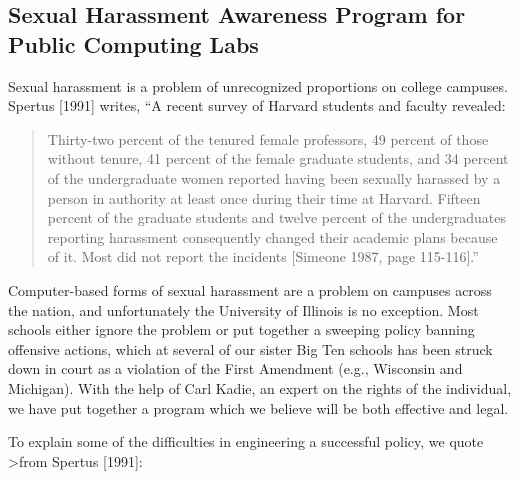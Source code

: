 \newpage


\subsection{Sexual Harassment Awareness Program
for Public Computing Labs}

Sexual harassment is a problem of unrecognized proportions on
college campuses.  Spertus [1991] writes,
``A recent
survey of Harvard students and faculty revealed:

\begin{quote}


     Thirty-two percent of the tenured female professors,
     49 percent of those without tenure, 41 percent of
     the female graduate students, and 34 percent of the
     undergraduate women reported having been sexually harassed by a person in authority at least once
     during their time at Harvard.  Fifteen percent of
     the graduate students and twelve percent of the
     undergraduates reporting harassment consequently
     changed their academic plans because of it.  Most
     did not report the incidents [Simeone 1987, page
     115-116].''

\end{quote}

Computer-based forms of sexual harassment
are  a problem on  campuses across the nation,
and unfortunately the University of Illinois is no exception.
Most schools either ignore the problem or put together a sweeping
policy banning offensive actions, which at several of our
sister Big Ten schools has been struck down in court as
a violation of the First Amendment (e.g.,  Wisconsin
and Michigan).
With the help of Carl Kadie, an expert on the rights of the individual,
we have put together a program which we believe will be both effective
and legal.

To explain some of the difficulties in engineering
a successful policy, we quote
>from Spertus [1991]:

